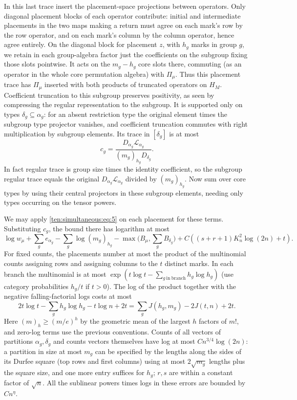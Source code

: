 In this last trace insert the placement-space projections between operators. Only diagonal placement blocks of each operator contribute: initial and intermediate placements in the two maps making a return must agree on each mark's row by the row operator, and on each mark's column by the column operator, hence agree entirely. On the diagonal block for placement \(z\), with \(h_g\) marks in group \(g\), we retain in each group-algebra factor just the coefficients on the subgroup fixing those slots pointwise. It acts on the \(m_g-h_g\) core slots there, commuting (as an operator in the whole core permutation algebra) with \(\Pi_\mu\). Thus this placement trace has \(\Pi_\mu\) inserted with both products of truncated operators on \(H_M\). Coefficient truncation to this subgroup preserves positivity, as seen by compressing the regular representation to the subgroup. It is supported only on types \(\delta_g\subseteq\alpha_g\): for an absent restriction type the original element times the subgroup type projector vanishes, and coefficient truncation commutes with right multiplication by subgroup elements. Its trace in \([\delta_g]\) is at most
\[
 c_g=\frac{D_{\alpha_g}\mathcal L_{\alpha_g}}{(m_g)_{h_g}D_{\delta_g}}.
\]
In fact regular trace is group size times the identity coefficient, so the subgroup regular trace equals the original \(D_{\alpha_g}\mathcal L_{\alpha_g}\) divided by \((m_g)_{h_g}\). Now sum over core types by using their central projectors in these subgroup elements, needing only types occurring on the tensor powers.

We may apply \eqref{ten:simultaneous:eq:5} on each placement for these terms. Substituting \(c_g\), the bound there has logarithm at most
\[
 \log w_\mu + \sum_g e_{\alpha_g} - \sum_g\log (m_g)_{h_g}
 -\max\big(B_\mu,\sum_g B_{\delta_g}\big)
 + C((s+r+1)K_n^2\log(2n)+t).
\]
For fixed counts, the placements number at most the product of the multinomial counts assigning rows and assigning columns to the \(t\) distinct marks. In each branch the multinomial is at most \(\exp(t\log t-\sum_{g\ \mathrm{in\ branch}} h_g\log h_g)\) (use category probabilities \(h_g/t\) if \(t>0\)). The log of the product together with the negative falling-factorial logs costs at most
\[
 2t\log t-\sum_g h_g\log h_g - t\log n+2t
 = \sum_g J(h_g,m_g)-2J(t,n)+2t .
\]
Here \((m)_h\ge (m/e)^h\) by the geometric mean of the largest \(h\) factors of \(m!\), and zero-log terms use the previous conventions. Counts of all vectors of partitions \(\alpha_g,\delta_g\) and counts vectors themselves have log at most \(C n^{3/4}\log(2n)\): a partition in size at most \(m_g\) can be specified by the lengths along the sides of its Durfee square (top rows and first columns) using at most \(2\sqrt{m_g}\) lengths plus the square size, and one more entry suffices for \(h_g\); \(r,s\) are within a constant factor of \(\sqrt n\). All the sublinear powers times logs in these errors are bounded by \(C n^\eta\).

